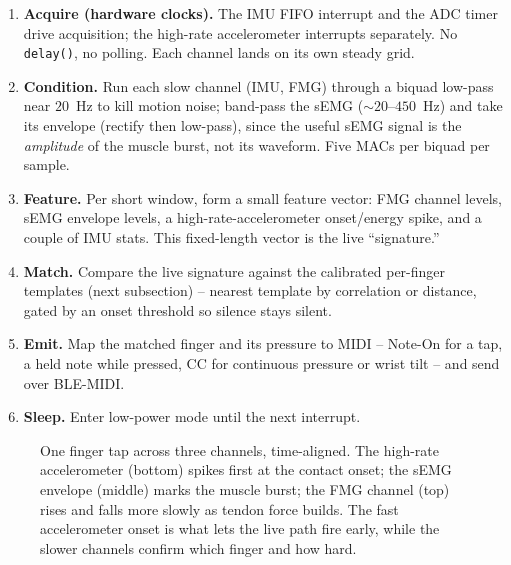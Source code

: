\begin{enumerate}
  \item \textbf{Acquire (hardware clocks).} The IMU FIFO interrupt and the ADC timer drive
    acquisition; the high-rate accelerometer interrupts separately. No \texttt{delay()}, no polling.
    Each channel lands on its own steady grid.
  \item \textbf{Condition.} Run each slow channel (IMU, FMG) through a biquad low-pass near $20$~Hz
    to kill motion noise; band-pass the sEMG ($\sim 20$--$450$~Hz) and take its envelope (rectify
    then low-pass), since the useful sEMG signal is the \emph{amplitude} of the muscle burst, not its
    waveform. Five MACs per biquad per sample.
  \item \textbf{Feature.} Per short window, form a small feature vector: FMG channel levels, sEMG
    envelope levels, a high-rate-accelerometer onset/energy spike, and a couple of IMU stats. This
    fixed-length vector is the live ``signature.''
  \item \textbf{Match.} Compare the live signature against the calibrated per-finger templates
    (next subsection) -- nearest template by correlation or distance, gated by an onset threshold so
    silence stays silent.
  \item \textbf{Emit.} Map the matched finger and its pressure to MIDI -- Note-On for a tap, a held
    note while pressed, CC for continuous pressure or wrist tilt -- and send over BLE-MIDI.
  \item \textbf{Sleep.} Enter low-power mode until the next interrupt.
\end{enumerate}

\begin{figure}[H]
\centering
{}
\caption{One finger tap across three channels, time-aligned. The high-rate accelerometer (bottom)
spikes first at the contact onset; the sEMG envelope (middle) marks the muscle burst; the FMG
channel (top) rises and falls more slowly as tendon force builds. The fast accelerometer onset is
what lets the live path fire early, while the slower channels confirm which finger and how hard.}
\label{ch40:fig-trace}
\end{figure}

